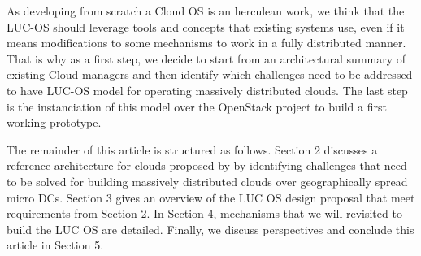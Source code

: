 As developing from scratch a Cloud OS is an herculean work, we think that the 
LUC-OS should leverage tools and concepts that existing systems use, even if 
it means modifications to some mechanisms to work in a fully distributed manner.
That is why as a first step, we decide to start from an architectural summary of 
existing Cloud managers and then identify which challenges need to be addressed
to have LUC-OS model for operating massively distributed clouds. The last step 
is the instanciation of this model over the OpenStack project to build a first
working prototype.

The remainder of this article is structured as follows. Section 2 discusses a 
reference architecture for clouds proposed by \cite{moreno2012iaas} by 
identifying challenges that need to be solved for building massively distributed 
clouds over geographically spread micro DCs. Section 3 gives an overview of the 
LUC OS design proposal that meet requirements from Section 2. In Section 4, 
mechanisms that we will revisited to build the LUC OS are detailed. Finally, we 
discuss perspectives and conclude this article in Section 5.